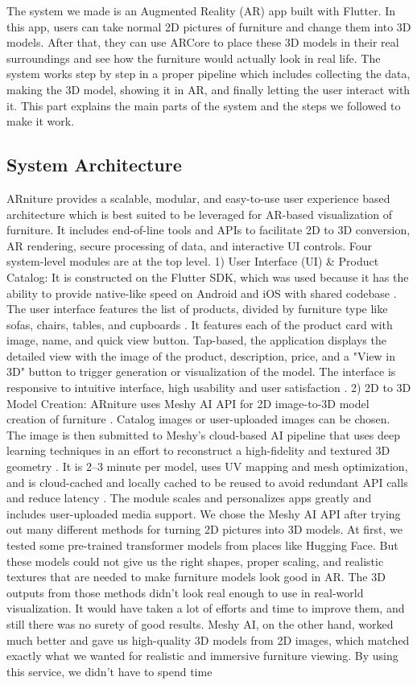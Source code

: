 \documentclass[12pt, a4paper]{article}
\begin{document}
The system we made is an Augmented Reality (AR) app built with Flutter. In this app, users can take normal 2D pictures of furniture and change them into 3D models. After that, they can use ARCore \cite{ref2} to place these 3D models in their real surroundings and see how the furniture would actually look in real life. The system works step by step in a proper pipeline which includes collecting the data, making the 3D model, showing it in AR, and finally letting the user interact with it. This part explains the main parts of the system and the steps we followed to make it work.

\subsection{System Architecture}

ARniture provides a scalable, modular, and easy-to-use user experience based architecture which is best suited to be leveraged for AR-based visualization of furniture. It includes end-of-line tools and APIs to facilitate 2D to 3D conversion, AR rendering, secure processing of data, and interactive UI controls. Four system-level modules are at the top level. 1) User Interface (UI) \& Product Catalog: It is constructed on the Flutter SDK, which was used because it has the ability to provide native-like speed on Android and iOS with shared codebase \cite{ref3,ref9}. The user interface features the list of products, divided by furniture type like sofas, chairs, tables, and cupboards \cite{ref6}. It features each of the product card with image, name, and quick view button. Tap-based, the application displays the detailed view with the image of the product, description, price, and a "View in 3D" button to trigger generation or visualization of the model. The interface is responsive to intuitive interface, high usability and user satisfaction \cite{ref8}. 2) 2D to 3D Model Creation: ARniture uses Meshy AI API for 2D image-to-3D model creation of furniture \cite{ref5}. Catalog images or user-uploaded images can be chosen. The image is then submitted to Meshy's cloud-based AI pipeline that uses deep learning techniques in an effort to reconstruct a high-fidelity and textured 3D geometry \cite{ref12}. It is 2--3 minute per model, uses UV mapping and mesh optimization, and is cloud-cached and locally cached to be reused to avoid redundant API calls and reduce latency \cite{ref20}. The module scales and personalizes apps greatly and includes user-uploaded media support. We chose the Meshy AI API after trying out many different methods for turning 2D pictures into 3D models. At first, we tested some pre-trained transformer models from places like Hugging Face. But these models could not give us the right shapes, proper scaling, and realistic textures that are needed to make furniture models look good in AR. The 3D outputs from those methods didn't look real enough to use in real-world visualization. It would have taken a lot of efforts and time to improve them, and still there was no surety of good results. Meshy AI, on the other hand, worked much better and gave us high-quality 3D models from 2D images, which matched exactly what we wanted for realistic and immersive furniture viewing. By using this service, we didn't have to spend time 
\end{document}
